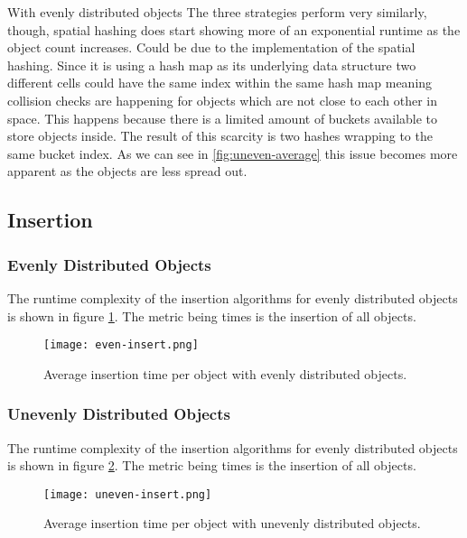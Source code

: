 \documentclass[a4paper, 12pt]{article}
\begin{document}
With evenly distributed objects The three strategies perform very similarly,
though, spatial hashing does start showing more of an exponential runtime as the
object count increases. Could be due to the implementation of the spatial
hashing. Since it is using a hash map as its underlying data structure two
different cells could have the same index within the same hash map meaning
collision checks are happening for objects which are not close to each other in
space. This happens because there is a limited amount of buckets available to
store objects inside. The result of this scarcity is two hashes wrapping to the
same bucket index. As we can see in \ref{fig:uneven-average} this issue becomes
more apparent as the objects are less spread out.

\subsection{Insertion}

\subsubsection{Evenly Distributed Objects}
The runtime complexity of the insertion algorithms for evenly distributed
objects is shown in figure \ref{fig:even-insert}. The metric being times is the
insertion of all objects.
\begin{figure}[H]
    \centering
    \caption{Average insertion time per object with evenly distributed objects.}
    \texttt{[image: even-insert.png]}
    \label{fig:even-insert}
\end{figure}

\subsubsection{Unevenly Distributed Objects}
The runtime complexity of the insertion algorithms for evenly distributed
objects is shown in figure \ref{fig:uneven-insert}. The metric being times is
the insertion of all objects.
\begin{figure}[H]
    \centering
    \caption{Average insertion time per object with unevenly distributed
    objects.}
    \texttt{[image: uneven-insert.png]}
    \label{fig:uneven-insert}
\end{figure}
\end{document}
